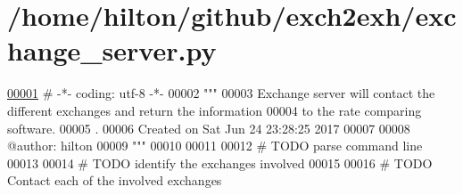\hypertarget{exchange__server_8py_source}{}\section{/home/hilton/github/exch2exh/exchange\+\_\+server.py}

\begin{DoxyCode}
\hypertarget{exchange__server_8py_source.tex_l00001}{}\hyperlink{namespaceexchange__server}{00001} \textcolor{comment}{# -*- coding: utf-8 -*-}
00002 \textcolor{stringliteral}{"""}
00003 \textcolor{stringliteral}{Exchange server will contact the different exchanges and return the information}
00004 \textcolor{stringliteral}{to the rate comparing software.}
00005 \textcolor{stringliteral}{.}
00006 \textcolor{stringliteral}{Created on Sat Jun 24 23:28:25 2017}
00007 \textcolor{stringliteral}{}
00008 \textcolor{stringliteral}{@author: hilton}
00009 \textcolor{stringliteral}{"""}
00010 
00011 
00012 \textcolor{comment}{# TODO parse command line}
00013 
00014 \textcolor{comment}{# TODO identify the exchanges involved }
00015 
00016 \textcolor{comment}{# TODO Contact each of the involved exchanges}
\end{DoxyCode}
